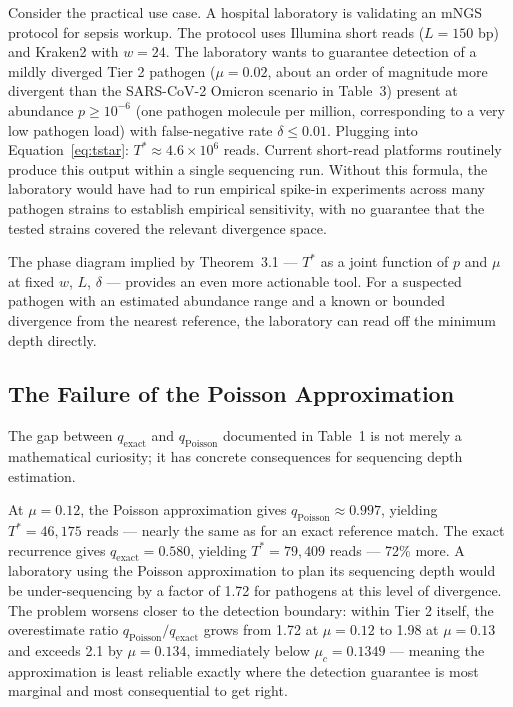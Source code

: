 \documentclass[12pt]{article}
\theoremstyle{definition}
\theoremstyle{plain}
\begin{document}
Consider the practical use case. A hospital laboratory is validating an mNGS
protocol for sepsis workup. The protocol uses Illumina short reads
($L=150$ bp) and Kraken2 with $w=24$. The laboratory wants to guarantee
detection of a mildly diverged Tier 2 pathogen ($\mu=0.02$, about an order of
magnitude more divergent than the SARS-CoV-2 Omicron scenario in Table~3)
present at abundance $p\ge10^{-6}$ (one pathogen molecule per million,
corresponding to a very low pathogen load) with false-negative rate
$\delta\le0.01$. Plugging into Equation~\eqref{eq:tstar}:
$T^{*}\approx4.6\times10^{6}$ reads. Current short-read platforms routinely
produce this output within a single sequencing run. Without this formula,
the laboratory would have had to run empirical spike-in experiments across
many pathogen strains to establish empirical sensitivity, with no guarantee
that the tested strains covered the relevant divergence space.

The phase diagram implied by Theorem~3.1 --- $T^{*}$ as a joint function of
$p$ and $\mu$ at fixed $w$, $L$, $\delta$ --- provides an even more
actionable tool. For a suspected pathogen with an estimated abundance range
and a known or bounded divergence from the nearest reference, the laboratory
can read off the minimum depth directly.

\subsection{The Failure of the Poisson Approximation}

The gap between $q_{\mathrm{exact}}$ and $q_{\mathrm{Poisson}}$ documented
in Table~1 is not merely a mathematical curiosity; it has concrete
consequences for sequencing depth estimation.

At $\mu=0.12$, the Poisson approximation gives
$q_{\mathrm{Poisson}}\approx0.997$, yielding $T^{*}=46{,}175$ reads ---
nearly the same as for an exact reference match. The exact recurrence gives
$q_{\mathrm{exact}}=0.580$, yielding $T^{*}=79{,}409$ reads --- 72\%
more. A laboratory using the Poisson approximation to plan its sequencing
depth would be under-sequencing by a factor of 1.72 for pathogens at this
level of divergence. The problem worsens closer to the detection boundary:
within Tier 2 itself, the overestimate ratio
$q_{\mathrm{Poisson}}/q_{\mathrm{exact}}$ grows from 1.72 at $\mu=0.12$ to
1.98 at $\mu=0.13$ and exceeds 2.1 by $\mu=0.134$, immediately below
$\mu_c=0.1349$ --- meaning the approximation is least reliable exactly where
the detection guarantee is most marginal and most consequential to get
right.
\end{document}
